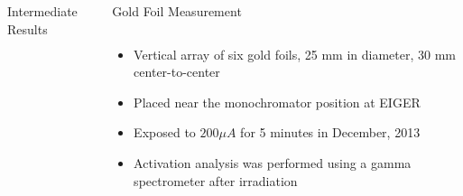 \documentclass[final,t]{beamer}
\begin{document}
\begin{frame}{}
\begin{columns}[t]
\begin{column}{.3\linewidth}
\begin{block}{Intermediate Results}
\begin{columns}
      \end{columns}

      \end{block}



    \end{column}

    
    \begin{column}{.3\linewidth}

      \begin{block}{Gold Foil Measurement}
        \begin{columns}[T]
          \begin{column}{.65\linewidth}
          \begin{itemize} 
          \item Vertical array of six gold foils, 25 mm in diameter, 30 mm center-to-center
          \item Placed near the monochromator position at EIGER
          \item Exposed to $200 \mu A$ for 5 minutes in December, 2013
          \item Activation analysis was performed using a gamma spectrometer after irradiation
          \end{itemize}


\end{column}
\end{columns}
\end{block}
\end{column}
\end{columns}
\end{frame}
\end{document}
